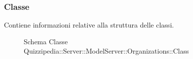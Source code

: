 \subsubsection{Classe }
Contiene informazioni relative alla struttura delle classi.
\begin{figure}[H]
\centering
\noindent{}
\caption[Schema Classe Class]{Schema Classe Quizzipedia::Server::ModelServer::Organizations::Class}
\end{figure}
